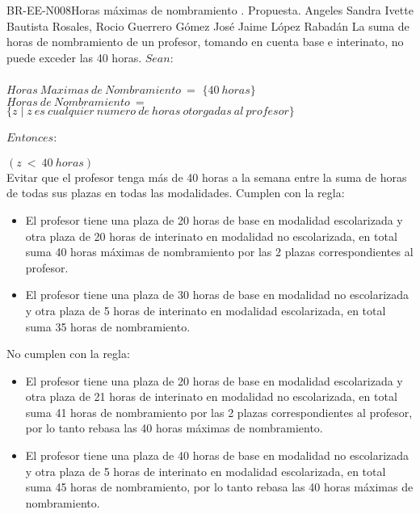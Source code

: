 \begin{BusinessRule}{BR-EE-N008}{Horas máximas de nombramiento}
	{\bcCondition}    %
	{\btEnabler}     %
	{\blControlling}    %
	.
	\BRItem[Estado] Propuesta.
	 Angeles
	 Sandra Ivette Bautista Rosales, Rocio Guerrero Gómez
	 José Jaime López Rabadán
	\BRItem[Descripción] La suma de horas de nombramiento de un profesor, tomando en cuenta base e interinato, no puede exceder las 40 horas.
		\BRItem[Sentencia]  $Sean:$ \\\\
		$Horas\ Maximas\ de\ Nombramiento\ =$ $\{40\ horas\}$ \\
		$Horas\ de\ Nombramiento\ =$ $\{z \mid z\ es\ cualquier\ numero\ de\ horas\ otorgadas\ al\ profesor\}$ \\\\
		$Entonces:$ \\\\
		$(z\ <\ 40\ horas)$ \\
	\BRItem[Motivación] Evitar que el profesor tenga más de 40 horas a la semana entre la suma de horas de todas sus plazas en todas las modalidades.
		 Cumplen con la regla: \cdtEmpty
		\begin{itemize}
			\item El profesor tiene una plaza de 20 horas de base en modalidad escolarizada y otra plaza de 20 horas de interinato en modalidad no escolarizada, en total suma 40 horas máximas de nombramiento por las 2 plazas correspondientes al profesor.
			\item El profesor tiene una plaza de 30 horas de base en modalidad no escolarizada y otra plaza de 5 horas de interinato en modalidad escolarizada, en total suma 35 horas de nombramiento.
		\end{itemize}
		 No cumplen con la regla: \cdtEmpty
		\begin{itemize}
			\item El profesor tiene una plaza de 20 horas de base en modalidad escolarizada y otra plaza de 21 horas de interinato en modalidad no escolarizada, en total suma 41 horas de nombramiento por las 2 plazas correspondientes al profesor, por lo tanto rebasa las 40 horas máximas de nombramiento.
			\item El profesor tiene una plaza de 40 horas de base en modalidad no escolarizada y otra plaza de 5 horas de interinato en modalidad escolarizada, en total suma 45 horas de nombramiento, por lo tanto rebasa las 40 horas máximas de nombramiento. 
		\end{itemize}
\end{BusinessRule}

